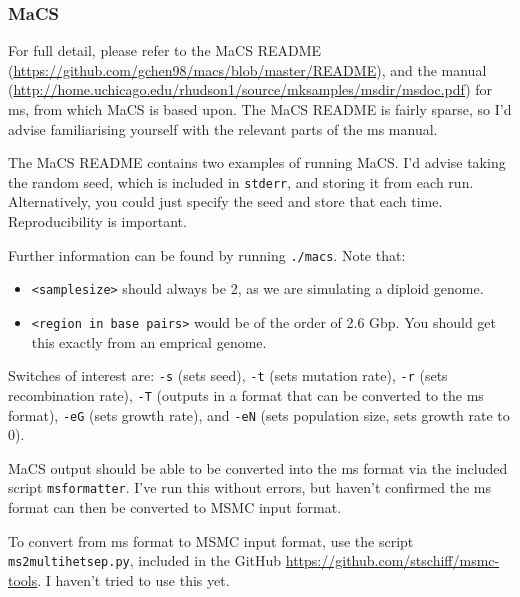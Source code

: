\documentclass[11pt,a4paper]{article}
\begin{document}
\subsubsection{MaCS}
For full detail, please refer to the MaCS README (\url{https://github.com/gchen98/macs/blob/master/README}), and the manual (\url{http://home.uchicago.edu/rhudson1/source/mksamples/msdir/msdoc.pdf}) for ms\cite{hudson2002generating}, from which MaCS is based upon. The MaCS README is fairly sparse, so I'd advise familiarising yourself with the relevant parts of the ms manual.

The MaCS README contains two examples of running MaCS. I'd advise taking the random seed, which is included in \texttt{stderr}, and storing it from each run. Alternatively, you could just specify the seed and store that each time. Reproducibility is important.

Further information can be found by running \texttt{./macs}. Note that:
\begin{itemize}
\item \texttt{<samplesize>} should always be 2, as we are simulating a diploid genome.
\item \texttt{<region in base pairs>} would be of the order of 2.6 Gbp. You should get this exactly from an emprical genome.
\end{itemize}
Switches of interest are: \texttt{-s} (sets seed), \texttt{-t} (sets mutation rate), \texttt{-r} (sets recombination rate), \texttt{-T} (outputs in a format that can be converted to the ms format), \texttt{-eG} (sets growth rate), and \texttt{-eN} (sets population size, sets growth rate to 0).

MaCS output should be able to be converted into the ms format via the included script \texttt{msformatter}. I've run this without errors, but haven't confirmed the ms format can then be converted to MSMC input format.

To convert from ms format to MSMC input format, use the script \texttt{ms2multihetsep.py}, included in the GitHub \url{https://github.com/stschiff/msmc-tools}. I haven't tried to use this yet.
\end{document}
